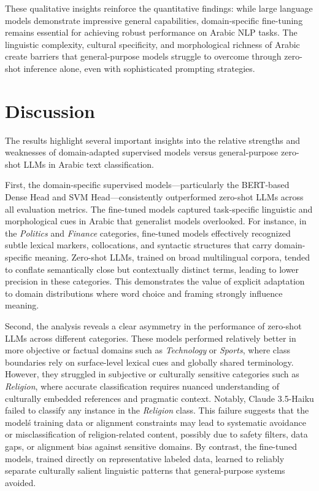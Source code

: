 \documentclass[sn-mathphys-num]{sn-jnl}
\begin{document}
These qualitative insights reinforce the quantitative findings: while large language models demonstrate impressive general capabilities, domain-specific fine-tuning remains essential for achieving robust performance on Arabic NLP tasks. The linguistic complexity, cultural specificity, and morphological richness of Arabic create barriers that general-purpose models struggle to overcome through zero-shot inference alone, even with sophisticated prompting strategies.

\section{Discussion}
\label{discussion}

The results highlight several important insights into the relative strengths and weaknesses of domain-adapted supervised models versus general-purpose zero-shot LLMs in Arabic text classification.

First, the domain-specific supervised models---particularly the BERT-based Dense Head and SVM Head---consistently outperformed zero-shot LLMs across all evaluation metrics. The fine-tuned models captured task-specific linguistic and morphological cues in Arabic that generalist models overlooked. For instance, in the \textit{Politics} and \textit{Finance} categories, fine-tuned models effectively recognized subtle lexical markers, collocations, and syntactic structures that carry domain-specific meaning. Zero-shot LLMs, trained on broad multilingual corpora, tended to conflate semantically close but contextually distinct terms, leading to lower precision in these categories. This demonstrates the value of explicit adaptation to domain distributions where word choice and framing strongly influence meaning.

Second, the analysis reveals a clear asymmetry in the performance of zero-shot LLMs across different categories. These models performed relatively better in more objective or factual domains such as \textit{Technology} or \textit{Sports}, where class boundaries rely on surface-level lexical cues and globally shared terminology. However, they struggled in subjective or culturally sensitive categories such as \textit{Religion}, where accurate classification requires nuanced understanding of culturally embedded references and pragmatic context. Notably, Claude 3.5-Haiku failed to classify any instance in the \textit{Religion} class. This failure suggests that the model\'s training data or alignment constraints may lead to systematic avoidance or misclassification of religion-related content, possibly due to safety filters, data gaps, or alignment bias against sensitive domains. By contrast, the fine-tuned models, trained directly on representative labeled data, learned to reliably separate culturally salient linguistic patterns that general-purpose systems avoided.
\end{document}
